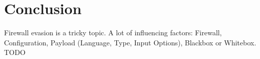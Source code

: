 \section{Conclusion}
\label{sec:conclusion}
Firewall evasion is a tricky topic. A lot of influencing factors: Firewall, Configuration, Payload (Language, Type, Input Options), Blackbox or Whitebox. {\color{red}TODO}
